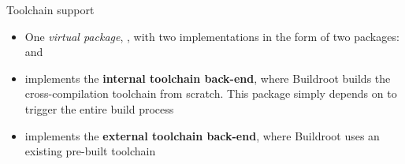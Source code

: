 \begin{frame}{Toolchain support}
  \begin{itemize}
  \item One {\em virtual package}, , with two
    implementations in the form of two packages:
     and 
  \item {} implements the {\bf internal
      toolchain back-end}, where Buildroot builds the cross-compilation
    toolchain from scratch. This package simply depends on
     to trigger the entire build process
  \item {} implements the {\bf external
      toolchain back-end}, where Buildroot uses an existing pre-built
    toolchain
  \end{itemize}
\end{frame}

